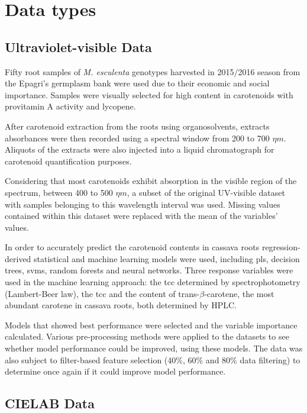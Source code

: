 \section{Data types}

\subsection{Ultraviolet-visible Data}

Fifty root samples of \textit{M. esculenta} genotypes harvested in 2015/2016 season from the Epagri's germplasm bank were used due to their economic and social importance. Samples were visually selected for high content in carotenoids with provitamin A activity and lycopene. 

After carotenoid extraction from the roots using organosolvents, extracts absorbances were then recorded using a spectral window from 200 to 700 $\eta m$. Aliquots of the extracts were also injected into a liquid chromatograph for carotenoid quantification purposes. 

Considering that most carotenoids exhibit absorption in the visible region of
the spectrum, between 400 to 500 $\eta m$, a subset of the original UV-visible
dataset with samples belonging to this wavelength interval was used. Missing values contained within this dataset were replaced with the mean of the variables' values.

In order to accurately predict the carotenoid contents in cassava roots regression-derived statistical and machine learning models were used, including \gls{pls}, decision trees, \gls{svm}s, random forests and neural networks. Three response variables were used in the machine learning approach: the \gls{tcc} determined by spectrophotometry (Lambert-Beer law), the \gls{tcc} and the content of trans-$\beta$-carotene, the most abundant carotene in cassava roots, both determined by HPLC.

Models that showed best performance were selected and the variable importance calculated. Various pre-processing methods were applied to the datasets to see whether model performance could be improved, using these models. The data was also subject to filter-based feature selection (40\%, 60\% and 80\% data filtering) to determine once again if it could improve model performance.


\subsection{CIELAB Data}

